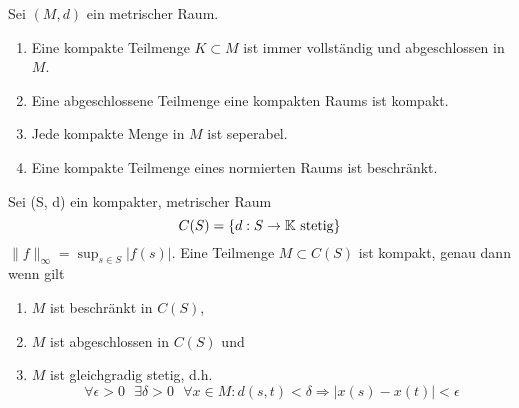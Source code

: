 \begin{prop}
	Sei $(M, d)$ ein metrischer Raum.
	\begin{enumerate}[label=\alph*\upshape)]
		\item Eine kompakte Teilmenge $K \subset M$ ist immer vollständig und abgeschlossen in $M$.
		\item Eine abgeschlossene Teilmenge eine kompakten Raums ist kompakt.
		\item Jede kompakte Menge in $M$ ist seperabel.
		\item Eine kompakte Teilmenge eines normierten Raums ist beschränkt.
	\end{enumerate}
	\begin{beweis}
	\end{beweis}

\end{prop}

\begin{satz}
	Sei (S, d) ein kompakter, metrischer Raum
	\[ C(S) = \{ d : S \rightarrow \mathbb{K} \text{ stetig} \} \]
	$\| f \|_{\infty} = \sup_{s \in S} | f(s) |$. Eine Teilmenge $M \subset C(S)$ ist kompakt, genau dann wenn gilt
		\begin{enumerate}[label=\alph*\upshape)]
			\item $M$ ist beschränkt in $C(S)$,
			\item $M$ ist abgeschlossen in $C(S)$ und
			\item $M$ ist gleichgradig stetig, d.h.
				\[ \forall \epsilon > 0 \text{ } \exists \delta > 0 \text{ } \forall x \in M: d(s, t) < \delta \Rightarrow | x(s) - x(t) | < \epsilon \]
		\end{enumerate}
\end{satz}
\begin{beweis}
\end{beweis}

\newpage






























